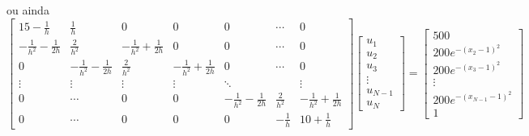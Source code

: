 ou ainda
\begin{equation*}
 \left[\begin{array}{ccccccc}
        15-\frac{1}{h}&\frac{1}{h}&0&0&0&\cdots&0\\
        -\frac{1}{h^2}-\frac{1}{2h}&\frac{2}{h^2}&-\frac{1}{h^2}+\frac{1}{2h}&0&0&\cdots&0\\
              0&  -\frac{1}{h^2}-\frac{1}{2h}&\frac{2}{h^2}&-\frac{1}{h^2}+\frac{1}{2h}&0&\cdots&0\\
              \vdots&\vdots&\vdots&\vdots&\ddots&&\vdots\\
              0&\cdots&0&0& -\frac{1}{h^2}-\frac{1}{2h}&\frac{2}{h^2}&-\frac{1}{h^2}+\frac{1}{2h}\\
              0&\cdots&0&0&0& -\frac{1}{h}&10+\frac{1}{h}
       \end{array}
\right]\left[\begin{array}{c}
             u_1\\u_2\\u_3 \\ \vdots\\ u_{N-1}\\u_N 
             \end{array}
\right]=\left[\begin{array}{c}
             500\\200e^{-(x_2-1)^2}\\200e^{-(x_3-1)^2} \\ \vdots\\ 200e^{-(x_{N-1}-1)^2}\\1 
             \end{array}
\right]
\end{equation*}
